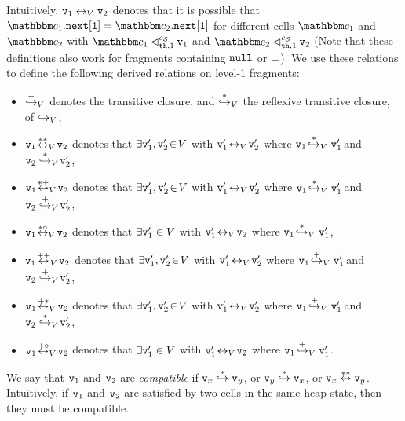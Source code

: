 Intuitively, $\mathtt{v}_1 \leftrightarrow_{V} \mathtt{v}_2$ denotes that it is
possible that
  $\cell_1.{\tt next[1]} = \cell_2.{\tt next[1]}$
for different cells  $\cell_1$ and $\cell_2$ with
  $\cell_1 \lsatfrag{1}{{\thread}}{\sconf} \frag_1$ and
  $\cell_2 \lsatfrag{1}{{\thread}}{\sconf} \frag_2$
(Note that these definitions also work for fragments containing
${\tt null}$ or $\bot$).
We use these relations to define the following derived relations on level-1 fragments:
\begin{itemize}
\item $\overset{+}\hookrightarrow_{V}$ denotes the transitive closure,
  and
   $\overset{*}\hookrightarrow_{V}$ the reflexive transitive closure, of
  $\hookrightarrow_{V}$,
\item $\mathtt{v}_1 \!  \overset{**}\leftrightarrow_{V}  \! \mathtt{v}_2$ denotes that 
  $\exists \mathtt{v}_1',\mathtt{v}_2' \!\in\! V$ with $\mathtt{v}_1' \! \leftrightarrow_{V} \! \mathtt{v}_2'$ where
  $\mathtt{v}_1 \!  \overset{*}\hookrightarrow_{V} \mathtt{v}_1' \!$ and $\mathtt{v}_2  \overset{*}\hookrightarrow_{V} \! \mathtt{v}_2'$,
\item $\mathtt{v}_1 \!  \overset{*+}\leftrightarrow_{V}  \! \mathtt{v}_2$ denotes that
  $\exists \mathtt{v}_1', \mathtt{v}_2' \!\in\! V$ with $\mathtt{v}_1' \! \leftrightarrow_{V} \! \mathtt{v}_2'$ where
  $\mathtt{v}_1 \!  \overset{*}\hookrightarrow_{V} \mathtt{v}_1' \!$ and $\mathtt{v}_2  \overset{+}\hookrightarrow_{V} \! \mathtt{v}_2'$,
\item $\mathtt{v}_1 \!  \overset{*\circ}\leftrightarrow_{V}  \! \mathtt{v}_2$ denotes that $\exists \mathtt{v}_1' \in V$ with $\mathtt{v}_1' \! \leftrightarrow_{V} \! \mathtt{v}_2$ where
  $\mathtt{v}_1 \!  \overset{*}\hookrightarrow_{V} \mathtt{v}_1'$,
\item $\mathtt{v}_1 \!  \overset{++}\leftrightarrow_{V}  \! \mathtt{v}_2$ denotes that
  $\exists \mathtt{v}_1',\mathtt{v}_2' \!\in\! V$ with $\mathtt{v}_1' \! \leftrightarrow_{V} \! \mathtt{v}_2'$ where
  $\mathtt{v}_1 \!  \overset{+}\hookrightarrow_{V} \mathtt{v}_1' \!$ and $\mathtt{v}_2  \overset{+}\hookrightarrow_{V} \! \mathtt{v}_2'$,
\item $\mathtt{v}_1 \!  \overset{+*}\leftrightarrow_{V}  \! \mathtt{v}_2$ denotes that
  $\exists \mathtt{v}_1',\mathtt{v}_2' \!\in\! V$ with $\mathtt{v}_1' \! \leftrightarrow_{V} \! \mathtt{v}_2'$ where
  $\mathtt{v}_1 \!  \overset{+}\hookrightarrow_{V} \mathtt{v}_1' \!$ and $\mathtt{v}_2  \overset{*}\hookrightarrow_{V} \! \mathtt{v}_2'$,
\item $\mathtt{v}_1 \!  \overset{+\circ}\leftrightarrow_{V}  \! \mathtt{v}_2$ denotes that
  $\exists \mathtt{v}_1' \in V$ with $\mathtt{v}_1' \! \leftrightarrow_{V} \! \mathtt{v}_2$ where
  $\mathtt{v}_1 \!  \overset{+}\hookrightarrow_{V} \mathtt{v}_1'$.
\end{itemize}
We say that $\mathtt{v}_1$ and $\mathtt{v}_2$ are {\em compatible} if $\mathtt{v}_x \overset{*}\hookrightarrow \mathtt{v}_y$, or $\mathtt{v}_y \overset{*}\hookrightarrow \mathtt{v}_x$, or $\mathtt{v}_x \overset{**}\leftrightarrow \mathtt{v}_y$. Intuitively, if $\mathtt{v}_1$ and
$\mathtt{v}_2$ are satisfied by two cells in the same heap state, then they must
be compatible.


